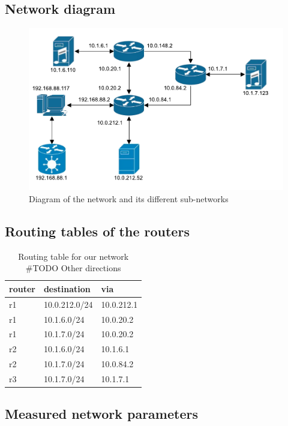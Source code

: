 \documentclass[parskip=full]{scrartcl}
\begin{document}
\subsection{Network diagram}
\begin{figure}[ht]
    \centering
    \includegraphics[width=\textwidth]{network_layout.pdf} 
    \caption{Diagram of the network and its different sub-networks}
    \label{fig:networkLayout}
\end{figure}
\subsection{Routing tables of the routers}

\begin{table}[hb]
    \centering
    \caption{Routing table for our network \#TODO Other directions}
    \label{tab:routing}
    \begin{tabular}{lll}
        \toprule
        \textbf{router} & \textbf{destination} & \textbf{via}  \\ \midrule
        r1 & 10.0.212.0/24 &  10.0.212.1 \\
        r1 & 10.1.6.0/24   &  10.0.20.2 \\
        r1 & 10.1.7.0/24   &  10.0.20.2 \\
        \midrule
        r2 & 10.1.6.0/24 & 10.1.6.1 \\
        r2 & 10.1.7.0/24 & 10.0.84.2 \\
        \midrule
        r3 & 10.1.7.0/24 & 10.1.7.1\\
        \bottomrule
    \end{tabular}
\end{table}

\subsection{Measured network parameters}
\end{document}
